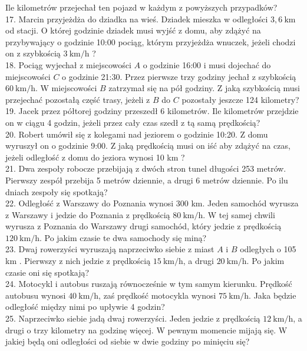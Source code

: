 \documentclass[10pt]{article}
\begin{document}
Ile kilometrów przejechał ten pojazd w każdym z powyższych przypadków?\\
17. Marcin przyjeżdża do dziadka na wieś. Dziadek mieszka w odległości \(3,6 \mathrm{~km}\) od stacji. O której godzinie dziadek musi wyjść z domu, aby zdążyć na przybywający o godzinie 10:00 pociąg, którym przyjeżdża wnuczek, jeżeli chodzi on z szybkością \(3 \mathrm{~km} / \mathrm{h}\) ?\\
18. Pociąg wyjechał z miejscowości \(A\) o godzinie 16:00 i musi dojechać do miejscowości \(C\) o godzinie 21:30. Przez pierwsze trzy godziny jechał z szybkością \(60 \mathrm{~km} / \mathrm{h}\). W miejscowości \(B\) zatrzymał się na pół godziny. Z jaką szybkością musi przejechać pozostałą część trasy, jeżeli z \(B\) do \(C\) pozostały jeszcze 124 kilometry?\\
19. Jacek przez półtorej godziny przeszedł 6 kilometrów. Ile kilometrów przejdzie on w ciągu 4 godzin, jeżeli przez cały czas szedł z tą samą prędkością?\\
20. Robert umówił się z kolegami nad jeziorem o godzinie 10:20. Z domu wyruszył on o godzinie 9:00. Z jaką prędkością musi on iść aby zdążyć na czas, jeżeli odległość z domu do jeziora wynosi 10 km ?\\
21. Dwa zespoły robocze przebijają z dwóch stron tunel długości 253 metrów. Pierwszy zespół przebija 5 metrów dziennie, a drugi 6 metrów dziennie. Po ilu dniach zespoły się spotkają?\\
22. Odległość z Warszawy do Poznania wynosi 300 km. Jeden samochód wyrusza z Warszawy i jedzie do Poznania z prędkością \(80 \mathrm{~km} / \mathrm{h}\). W tej samej chwili wyrusza z Poznania do Warszawy drugi samochód, który jedzie z prędkością \(120 \mathrm{~km} / \mathrm{h}\). Po jakim czasie te dwa samochody się miną?\\
23. Dwaj rowerzyści wyruszają naprzeciwko siebie z miast \(A\) i \(B\) odległych o 105 km . Pierwszy z nich jedzie z prędkością \(15 \mathrm{~km} / \mathrm{h}\), a drugi \(20 \mathrm{~km} / \mathrm{h}\). Po jakim czasie oni się spotkają?\\
24. Motocykl i autobus ruszają równocześnie w tym samym kierunku. Prędkość autobusu wynosi \(40 \mathrm{~km} / \mathrm{h}\), zaś prędkość motocykla wynosi \(75 \mathrm{~km} / \mathrm{h}\). Jaka będzie odległość między nimi po upływie 4 godzin?\\
25. Naprzeciwko siebie jadą dwaj rowerzyści. Jeden jedzie z prędkością \(12 \mathrm{~km} / \mathrm{h}\), a drugi o trzy kilometry na godzinę więcej. W pewnym momencie mijają się. W jakiej będą oni odległości od siebie w dwie godziny po minięciu się?\\
\end{document}
